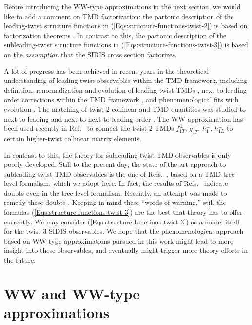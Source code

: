 \documentclass[a4paper,11pt]{article}
\begin{document}
Before introducing the WW-type approximations in the next section,
we would like to add a comment on TMD factorization: the
partonic description of the leading-twist structure functions in
(\ref{Eqs:structure-functions-twist-2}) is based on factorization
theorems \cite{Collins:1981uk,Ji:2004wu,Ji:2004xq,Collins:2011zzd,
Echevarria:2012js}. In contrast to this, the partonic description
of the subleading-twist structure functions in
(\ref{Eqs:structure-functions-twist-3}) is based on the
{\it assumption} that the SIDIS cross section factorizes.

A lot of progress has been achieved in recent years in the
theoretical understanding of leading-twist observables within the TMD
framework, including definition, renormalization and evolution of
leading-twist TMDs
\cite{Aybat:2011zv,Aybat:2011ge,Echevarria:2014xaa,Collins:2014jpa},
next-to-leading order corrections within the TMD framework
\cite{Ma:2013aca}, and phenomenological fits with evolution
\cite{Aybat:2011ta,Kang:2015msa}.
The matching of twist-2 collinear and TMD quantities was
studied to next-to-leading and next-to-next-to-leading order
\cite{Gutierrez-Reyes:2017glx,Gutierrez-Reyes:2018qez}.
The WW approximation has been used recently in Ref.~\cite{Scimemi:2018mmi}
to connect the twist-2 TMDs $f_{1T}^\perp$, $g_{1T}^\perp$, $h_{1}^\perp$,
$h_{1L}^\perp$ to certain higher-twist collinear matrix elements.

In contrast to this, the theory for subleading-twist TMD observables is
only poorly developed. Still to the present day, the state-of-the-art
approach to subleading-twist TMD observables is the one of
Refs.~\cite{Kotzinian:1994dv,Mulders:1995dh,Boer:1997nt,Goeke:2005hb,
Bacchetta:2006tn},
based on a TMD tree-level formalism, which we adopt here.
In fact, the results of Refs.~\cite{Metz:2004je,Gamberg:2006ru}
indicate doubts even in the tree-level formalism.
Recently, an attempt was made to remedy these doubts \cite{Chen:2016hgw}.
Keeping in mind these ``words of warning,'' still the formulas
(\ref{Eqs:structure-functions-twist-3})
are the best that theory has to offer currently. We may consider
(\ref{Eqs:structure-functions-twist-3}) as a model itself for
the twist-3 SIDIS observables. We hope that the phenomenological
approach based on WW-type approximations pursued in this work might
lead to more insight into these observables, and eventually might
trigger more theory efforts in the future.

%
\section{WW and WW-type approximations}
\label{Sec-3:WW}
\end{document}
